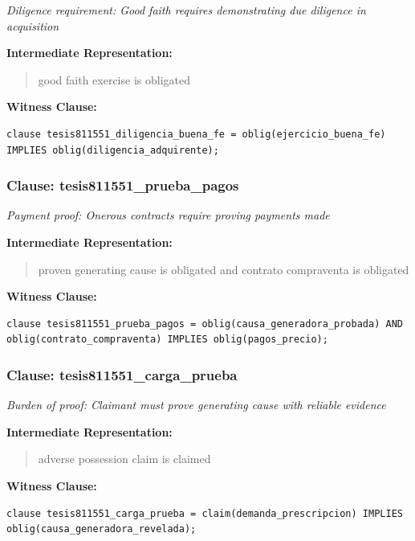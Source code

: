 \documentclass[11pt,a4paper]{article}
\begin{document}
\textit{Diligence requirement: Good faith requires demonstrating due diligence in acquisition}

\textbf{Intermediate Representation:}

\begin{quote}
good faith exercise is obligated
\end{quote}

\textbf{Witness Clause:}

\begin{lstlisting}[style=witnessstyle, language=Witness]
clause tesis811551_diligencia_buena_fe = oblig(ejercicio_buena_fe) IMPLIES oblig(diligencia_adquirente);
\end{lstlisting}

\subsubsection{Clause: tesis811551\_prueba\_pagos}

\textit{Payment proof: Onerous contracts require proving payments made}

\textbf{Intermediate Representation:}

\begin{quote}
proven generating cause is obligated and contrato compraventa is obligated
\end{quote}

\textbf{Witness Clause:}

\begin{lstlisting}[style=witnessstyle, language=Witness]
clause tesis811551_prueba_pagos = oblig(causa_generadora_probada) AND oblig(contrato_compraventa) IMPLIES oblig(pagos_precio);
\end{lstlisting}

\subsubsection{Clause: tesis811551\_carga\_prueba}

\textit{Burden of proof: Claimant must prove generating cause with reliable evidence}

\textbf{Intermediate Representation:}

\begin{quote}
adverse possession claim is claimed
\end{quote}

\textbf{Witness Clause:}

\begin{lstlisting}[style=witnessstyle, language=Witness]
clause tesis811551_carga_prueba = claim(demanda_prescripcion) IMPLIES oblig(causa_generadora_revelada);
\end{lstlisting}
\end{document}
